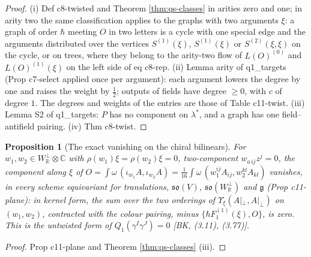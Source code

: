 \documentclass[11pt]{article}
\numberwithin{equation}{section}
\theoremstyle{plain}
\newtheorem{proposition}[theorem]{Proposition}
\theoremstyle{definition}
\newcommand{\Ap}{A|_{\perp}}
\begin{document}
\begin{proof}
(i) Def c8-twisted and Theorem \ref{thm:qs-classes} in arities zero and one; in arity two the same classification applies to the graphs with two arguments $\xi$: a graph of order $\hbar$ meeting $O$ in two letters is a cycle with one special edge and the arguments distributed over the vertices $S^{(1)}(\xi)$, $S^{(1)}(\xi)$ or $S^{(2)}(\xi,\xi)$ on the cycle, or on trees, where they belong to the arity-two flow of $L(O)^{(0)}$ and $L(O)^{(1)}(\xi)$ on the left side of eq c8-rep. (ii) Lemma arity of q1\_targets (Prop c7-select applied once per argument): each argument lowers the degree by one and raises the weight by $\tfrac12$; outputs of fields have degree $\ge0$, with $c$ of degree $1$. The degrees and weights of the entries are those of Table c11-twist. (iii) Lemma S2 of q1\_targets: $P$ has no component on $\lambda^*$, and a graph has one field--antifield pairing. (iv) Thm c8-twist.
\end{proof}

\begin{proposition}[The exact vanishing on the chiral bilinears]
\label{prop:qs-plane}
For $w_1,w_2\in W^\perp_{\mathbb R}\otimes\mathbb C$ with $\rho(w_1)\xi=\rho(w_2)\xi=0$, two-component $w_{a\,ij}z^j=0$, the component along $\xi$ of $O=\int\omega\,(\iota_{w_1}A,\iota_{w_2}A)=\tfrac1{16}\int\omega\,(w_1^{ij}A_{ij},w_2^{kl}A_{kl})$ vanishes, in every scheme equivariant for translations, $\mathfrak{so}(V)$, $\mathfrak{so}(W^\perp_{\mathbb R})$ and $\mathfrak g$ (Prop c11-plane): in kernel form, the sum over the two orderings of $\Upsilon_\xi(\Ap,\Ap)$ on $(w_1,w_2)$, contracted with the colour pairing, minus $\{\hbar F_1^{(1)}(\xi),O\}$, is zero. This is the untwisted form of $Q_1(\gamma^I\gamma^J)=0$ [BK, (3.11), (3.77)].
\end{proposition}

\begin{proof}
Prop c11-plane and Theorem \ref{thm:qs-classes} (iii).
\end{proof}
\end{document}
